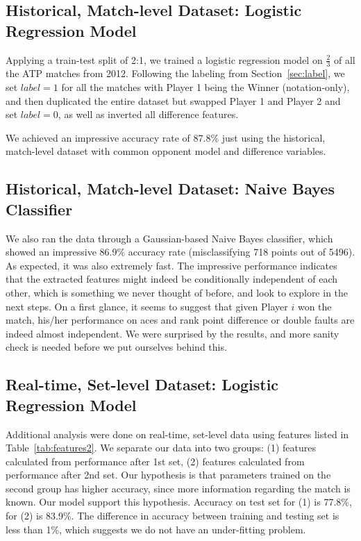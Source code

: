 \documentclass[paper=a4, fontsize=10pt]{scrartcl} %
\numberwithin{equation}{section} %
\numberwithin{figure}{section} %
\numberwithin{table}{section} %
\begin{document}
\subsection{Historical, Match-level Dataset: Logistic Regression Model}
Applying a train-test split of 2:1, we trained a logistic regression model on $\frac{2}{3}$ of all the ATP matches from 2012. Following the labeling from Section~\ref{sec:label}, we set $label = 1$ for all the matches with Player 1 being the Winner (notation-only), and then duplicated the entire dataset but swapped Player 1 and Player 2 and set $label = 0$, as well as inverted all difference features.

We achieved an impressive accuracy rate of 87.8\% just using the historical, match-level dataset with common opponent model and difference variables. 

\subsection{Historical, Match-level Dataset: Naive Bayes Classifier}
We also ran the data through a Gaussian-based Naive Bayes classifier, which showed an impressive 86.9\% accuracy rate (misclassifying 718 points out of 5496). As expected, it was also extremely fast. The impressive performance indicates that the extracted features might indeed be conditionally independent of each other, which is something we never thought of before, and look to explore in the next steps. On a first glance, it seems to suggest that given Player $i$ won the match, his/her performance on aces and rank point difference or double faults are indeed almost independent. We were surprised by the results, and more sanity check is needed before we put ourselves behind this. 
\subsection{Real-time, Set-level Dataset: Logistic Regression Model}
Additional analysis were done on real-time, set-level data using features listed in Table~\ref{tab:features2}. We separate our data into two groups: (1) features calculated from performance after 1st set, (2) features calculated from performance after 2nd set.  Our hypothesis is that parameters trained on the second group has higher accuracy, since more information regarding the match is known.  Our model support this hypothesis.  Accuracy on test set for (1) is 77.8\%, for (2) is 83.9\%.  The difference in accuracy between training and testing set is less than 1\%, which suggests we do not have an under-fitting problem.
\end{document}
